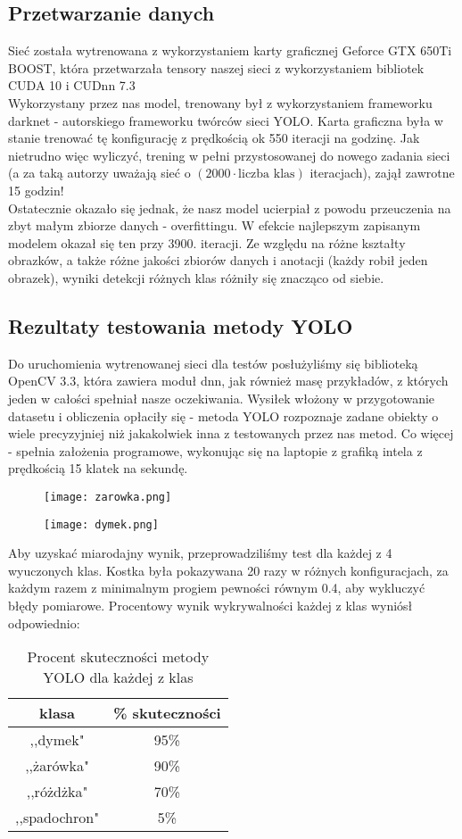 \documentclass[polish,a4paper]{article}
\begin{document}
\subsection{Przetwarzanie danych}
Sieć została wytrenowana z wykorzystaniem karty graficznej Geforce GTX 650Ti BOOST, która przetwarzała tensory naszej sieci z wykorzystaniem bibliotek CUDA 10 i CUDnn 7.3\\
Wykorzystany przez nas model, trenowany był z wykorzystaniem frameworku darknet\cite{darknet} - autorskiego frameworku twórców sieci YOLO. Karta graficzna była w stanie trenować tę konfigurację z prędkością ok 550 iteracji na godzinę. Jak nietrudno więc wyliczyć, trening w pełni przystosowanej do nowego zadania sieci (a za taką autorzy uważają sieć o $(2000\cdot \text{liczba klas})$ iteracjach), zajął zawrotne 15 godzin!\\
Ostatecznie okazało się jednak, że nasz model ucierpiał z powodu przeuczenia na zbyt małym zbiorze danych - overfittingu. W efekcie najlepszym zapisanym modelem okazał się ten przy 3900. iteracji. Ze względu na różne kształty obrazków, a także różne jakości zbiorów danych i anotacji (każdy robił jeden obrazek), wyniki detekcji różnych klas różniły się znacząco od siebie. 

\subsection{Rezultaty testowania metody YOLO}
Do uruchomienia wytrenowanej sieci dla testów posłużyliśmy się biblioteką OpenCV 3.3, która zawiera moduł dnn, jak również masę przykładów, z których jeden w całości spełniał nasze oczekiwania.
Wysiłek włożony w przygotowanie datasetu i obliczenia opłaciły się - metoda YOLO rozpoznaje zadane obiekty o wiele precyzyjniej niż jakakolwiek inna z testowanych przez nas metod. Co więcej - spełnia założenia programowe, wykonując się na laptopie z grafiką intela z prędkością 15 klatek na sekundę.


\begin{figure}[H]
\centering
\texttt{[image: zarowka.png]}
\end{figure}
\begin{figure}[H]
\centering
\texttt{[image: dymek.png]}
\end{figure}

Aby uzyskać miarodajny wynik, przeprowadziliśmy test dla każdej z 4 wyuczonych klas. Kostka była pokazywana 20 razy w różnych konfiguracjach, za każdym razem z minimalnym progiem pewności równym 0.4, aby wykluczyć błędy pomiarowe. Procentowy wynik wykrywalności każdej z klas wyniósł odpowiednio:
\begin{table}[H]
\centering
\begin{tabular}{|c|c|} 
\hline
klasa & \% skuteczności \\
\hline
,,dymek" & 95\%\\
\hline
,,żarówka" & 90\% \\
\hline
,,różdżka" & 70\% \\
\hline
,,spadochron" & 5\% \\
\hline
\end{tabular}
\caption{Procent skuteczności metody YOLO dla każdej z klas}
\end{table}
\end{document}
